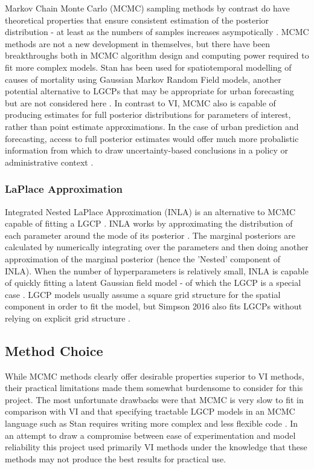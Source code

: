 Markov Chain Monte Carlo (MCMC) sampling methods by contrast do have theoretical properties that ensure consistent estimation of the posterior distribution - at least  as the numbers of samples increases asympotically \cite{teng_2017}. MCMC methods are not a new development in themselves, but there have been breakthroughs both in MCMC algorithm design and computing power required to fit more complex models. Stan has been used for spatiotemporal modelling of causes of mortality using Gaussian Markov Random Field models, another potential alternative to LGCPs that may be appropriate for urban forecasting but are not considered here \cite{foreman_2017}. In contrast to VI, MCMC also is capable of producing estimates for full posterior distributions for parameters of interest, rather than point estimate approximations. In the case of urban prediction and forecasting, access to full posterior estimates would offer much more probalistic information from which to draw uncertainty-based conclusions in a policy or administrative context .

\subsubsection{LaPlace Approximation}

Integrated Nested LaPlace Approximation (INLA) is an alternative to MCMC capable of fitting a LGCP \cite{illian_toolbox}. INLA works by approximating the distribution of each parameter around the mode of its posterior \cite{lindgren2015bayesian}. The marginal posteriors are calculated by numerically integrating over the parameters and then doing another approximation of the marginal posterior (hence the 'Nested' component of INLA). When the number of hyperparameters is relatively small, INLA is capable of quickly fitting a latent Gaussian field model - of which the LGCP is a special case \cite{rue2009approximate}. LGCP models usually assume a square grid structure for the spatial component in order to fit the model, but Simpson 2016 also fits LGCPs without relying on explicit grid structure \cite{simpson2016going}.


\subsection{Method Choice}

While MCMC methods clearly offer desirable properties superior to VI methods, their practical limitations made them somewhat burdensome to consider for this project. The most unfortunate drawbacks were that MCMC is very slow to fit in comparison with VI and that specifying tractable LGCP models in an MCMC language such as Stan requires writing more complex and less flexible code \cite{Flaxman2015FastHG}. In an attempt to draw a compromise between ease of experimentation and model reliability this project used primarily VI methods under the knowledge that these methods may not produce the best results for practical use.


